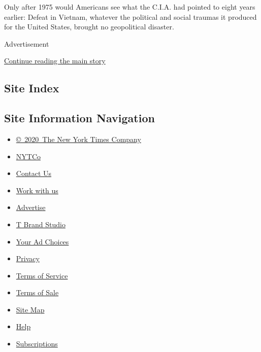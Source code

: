 Only after 1975 would Americans see what the C.I.A. had pointed to eight
years earlier: Defeat in Vietnam, whatever the political and social
traumas it produced for the United States, brought no geopolitical
disaster.

Advertisement

\protect\hyperlink{after-bottom}{Continue reading the main story}

\hypertarget{site-index}{%
\subsection{Site Index}\label{site-index}}

\hypertarget{site-information-navigation}{%
\subsection{Site Information
Navigation}\label{site-information-navigation}}

\begin{itemize}
\tightlist
\item
  \href{https://help.nytimes3xbfgragh.onion/hc/en-us/articles/115014792127-Copyright-notice}{©~2020~The
  New York Times Company}
\end{itemize}

\begin{itemize}
\tightlist
\item
  \href{https://www.nytco.com/}{NYTCo}
\item
  \href{https://help.nytimes3xbfgragh.onion/hc/en-us/articles/115015385887-Contact-Us}{Contact
  Us}
\item
  \href{https://www.nytco.com/careers/}{Work with us}
\item
  \href{https://nytmediakit.com/}{Advertise}
\item
  \href{http://www.tbrandstudio.com/}{T Brand Studio}
\item
  \href{https://www.nytimes3xbfgragh.onion/privacy/cookie-policy\#how-do-i-manage-trackers}{Your
  Ad Choices}
\item
  \href{https://www.nytimes3xbfgragh.onion/privacy}{Privacy}
\item
  \href{https://help.nytimes3xbfgragh.onion/hc/en-us/articles/115014893428-Terms-of-service}{Terms
  of Service}
\item
  \href{https://help.nytimes3xbfgragh.onion/hc/en-us/articles/115014893968-Terms-of-sale}{Terms
  of Sale}
\item
  \href{https://spiderbites.nytimes3xbfgragh.onion}{Site Map}
\item
  \href{https://help.nytimes3xbfgragh.onion/hc/en-us}{Help}
\item
  \href{https://www.nytimes3xbfgragh.onion/subscription?campaignId=37WXW}{Subscriptions}
\end{itemize}
